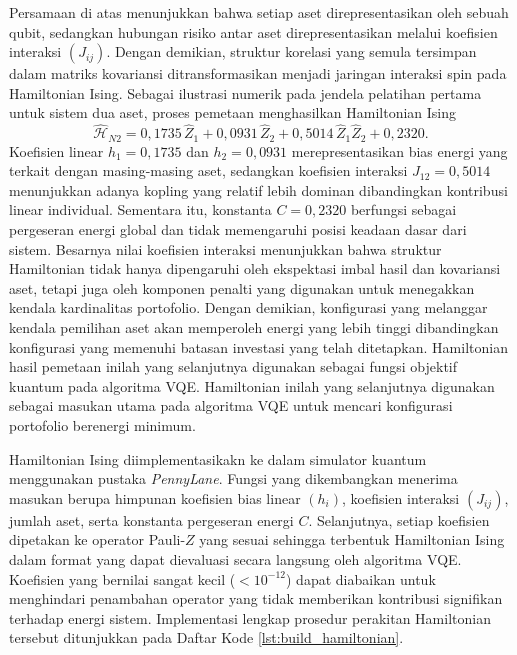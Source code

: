 Persamaan di atas menunjukkan bahwa setiap aset direpresentasikan oleh sebuah qubit, sedangkan hubungan risiko antar aset direpresentasikan melalui koefisien interaksi \((J_{ij})\). Dengan demikian, struktur korelasi yang semula tersimpan dalam matriks kovariansi ditransformasikan menjadi jaringan interaksi spin pada Hamiltonian Ising. Sebagai ilustrasi numerik pada jendela pelatihan pertama untuk sistem dua aset, proses pemetaan menghasilkan Hamiltonian Ising
\begin{equation}
\hat{\mathcal{H}}_{N2}
=
0,1735\,\hat{Z}_1
+
0,0931\,\hat{Z}_2
+
0,5014\,\hat{Z}_1\hat{Z}_2
+
0,2320.
\end{equation}
Koefisien linear \(h_1=0,1735\) dan \(h_2=0,0931\) merepresentasikan bias energi yang terkait dengan masing-masing aset, sedangkan koefisien interaksi \(J_{12}=0,5014\) menunjukkan adanya kopling yang relatif lebih dominan dibandingkan kontribusi linear individual. Sementara itu, konstanta \(C=0,2320\) berfungsi sebagai pergeseran energi global dan tidak memengaruhi posisi keadaan dasar dari sistem. Besarnya nilai koefisien interaksi menunjukkan bahwa struktur Hamiltonian tidak hanya dipengaruhi oleh ekspektasi imbal hasil dan kovariansi aset, tetapi juga oleh komponen penalti yang digunakan untuk menegakkan kendala kardinalitas portofolio. Dengan demikian, konfigurasi yang melanggar kendala pemilihan aset akan memperoleh energi yang lebih tinggi dibandingkan konfigurasi yang memenuhi batasan investasi yang telah ditetapkan. Hamiltonian hasil pemetaan inilah yang selanjutnya digunakan sebagai fungsi objektif kuantum pada algoritma VQE. Hamiltonian inilah yang selanjutnya digunakan sebagai masukan utama pada algoritma VQE untuk mencari konfigurasi portofolio berenergi minimum.

Hamiltonian Ising diimplementasikakn ke dalam simulator kuantum menggunakan pustaka \textit{PennyLane}. Fungsi yang dikembangkan menerima masukan berupa himpunan koefisien bias linear \((h_i)\), koefisien interaksi \((J_{ij})\), jumlah aset, serta konstanta pergeseran energi \(C\). Selanjutnya, setiap koefisien dipetakan ke operator Pauli-\(Z\) yang sesuai sehingga terbentuk Hamiltonian Ising dalam format yang dapat dievaluasi secara langsung oleh algoritma VQE. Koefisien yang bernilai sangat kecil (\(<10^{-12}\)) dapat diabaikan untuk menghindari penambahan operator yang tidak memberikan kontribusi signifikan terhadap energi sistem. Implementasi lengkap prosedur perakitan Hamiltonian tersebut ditunjukkan pada Daftar Kode \ref{lst:build_hamiltonian}.

